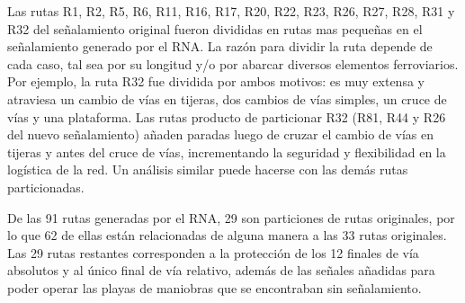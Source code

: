     Las rutas R1, R2, R5, R6, R11, R16, R17, R20, R22, R23, R26, R27, R28, R31 y R32 del señalamiento original fueron divididas en rutas mas pequeñas en el señalamiento generado por el RNA. La razón para dividir la ruta depende de cada caso, tal sea por su longitud y/o por abarcar diversos elementos ferroviarios. Por ejemplo, la ruta R32 fue dividida por ambos motivos: es muy extensa y atraviesa un cambio de vías en tijeras, dos cambios de vías simples, un cruce de vías y una plataforma. Las rutas producto de particionar R32 (R81, R44 y R26 del nuevo señalamiento) añaden paradas luego de cruzar el cambio de vías en tijeras y antes del cruce de vías, incrementando la seguridad y flexibilidad en la logística de la red. Un análisis similar puede hacerse con las demás rutas particionadas.
    
    De las 91 rutas generadas por el RNA, 29 son particiones de rutas originales, por lo que 62 de ellas están relacionadas de alguna manera a las 33 rutas originales. Las 29 rutas restantes corresponden a la protección de los 12 finales de vía absolutos y al único final de vía relativo, además de las señales añadidas para poder operar las playas de maniobras que se encontraban sin señalamiento.
